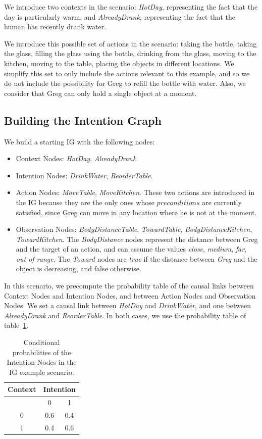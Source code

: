 We introduce two contexts in the scenario: \textit{HotDay}, representing the fact that the day is particularly warm, and \textit{AlreadyDrank}, representing the fact that the human has recently drank water.

We introduce this possible set of actions in the scenario: taking the bottle, taking the glass, filling the glass using the bottle, drinking from the glass, moving to the kitchen, moving to the table, placing the objects in different locations. We simplify this set to only include the actions relevant to this example, and so we do not include the possibility for Greg to refill the bottle with water. Also, we consider that Greg can only hold a single object at a moment. 

\subsection{Building the Intention Graph}
We build a starting IG with the following nodes:
\begin{itemize}
	\item Context Nodes: \textit{HotDay}, \textit{AlreadyDrank}.
	\item Intention Nodes: \textit{DrinkWater}, \textit{ReorderTable}.
	\item Action Nodes: \textit{MoveTable}, \textit{MoveKitchen}. These two actions are introduced in the IG because they are the only ones whose $preconditions$ are currently satisfied, since Greg can move in any location where he is not at the moment.
	\item Observation Nodes: \textit{BodyDistanceTable}, \textit{TowardTable}, \textit{BodyDistanceKitchen}, \textit{TowardKitchen}. The \textit{BodyDistance} nodes represent the distance between Greg and the target of an action, and can assume the values \textit{close}, \textit{medium}, \textit{far}, \textit{out of range}. The \textit{Toward} nodes are \textit{true} if the distance between \textit{Greg} and the object is decreasing, and false otherwise.
\end{itemize}


In this scenario, we precompute the probability table of the causal links between Context Nodes and Intention Nodes, and between Action Nodes and Observation Nodes. We set a causal link between \textit{HotDay} and \textit{DrinkWater}, and one between \textit{AlreadyDrank} and \textit{ReorderTable}. In both cases, we use the probability table of table~\ref{table:intention-ig_intention}.

 \begin{table}[h!]
\centering
\begin{tabular}{|c|c|c|}
\hline
Context & \multicolumn{2}{|c|}{Intention} \\ \hline \hline
& 0 & 1 \\ \hline
0  & 0.6 & 0.4 \\ \hline
1 & 0.4 & 0.6 \\ \hline
\end{tabular}
\caption{Conditional probabilities of the Intention Nodes in the IG example scenario.}
 \label{table:intention-ig_intention}    
\end{table}

